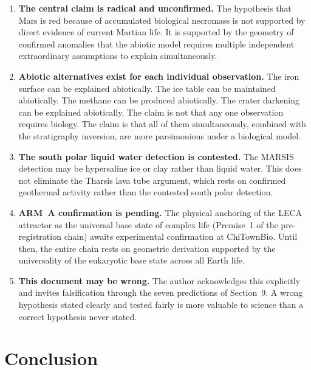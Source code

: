 \documentclass[11pt, a4paper]{article}
\begin{document}
\begin{enumerate}[leftmargin=*, label=(\arabic*)]

\item \textbf{The central claim is radical
  and unconfirmed.}
  The hypothesis that Mars is red because
  of accumulated biological necromass is
  not supported by direct evidence of
  current Martian life. It is supported
  by the geometry of confirmed anomalies
  that the abiotic model requires multiple
  independent extraordinary assumptions
  to explain simultaneously.

\item \textbf{Abiotic alternatives exist
  for each individual observation.}
  The iron surface can be explained
  abiotically.
  The ice table can be maintained abiotically.
  The methane can be produced abiotically.
  The crater darkening can be explained
  abiotically.
  The claim is not that any one observation
  requires biology. The claim is that all
  of them simultaneously, combined with
  the stratigraphy inversion, are more
  parsimonious under a biological model.

\item \textbf{The south polar liquid water
  detection is contested.}
  The MARSIS detection \cite{orosei2018}
  may be hypersaline ice or clay rather
  than liquid water. This does not
  eliminate the Tharsis lava tube
  argument, which rests on confirmed
  geothermal activity rather than
  the contested south polar detection.

\item \textbf{ARM~A confirmation is pending.}
  The physical anchoring of the LECA
  attractor as the universal base state
  of complex life (Premise~1 of the
  pre-registration chain) awaits
  experimental confirmation at ChiTownBio.
  Until then, the entire chain rests on
  geometric derivation supported by the
  universality of the eukaryotic base
  state across all Earth life.

\item \textbf{This document may be wrong.}
  The author acknowledges this explicitly
  and invites falsification through the
  seven predictions of Section~9.
  A wrong hypothesis stated clearly and
  tested fairly is more valuable to science
  than a correct hypothesis never stated.

\end{enumerate}

\section{Conclusion}
\end{document}
